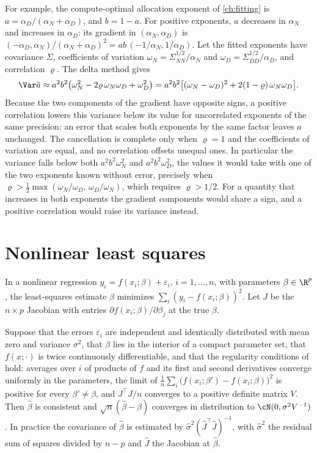 \begin{refsection}
For example, the compute-optimal allocation exponent of \cref{ch:fitting} is $a=\alpha_D/(\alpha_N+\alpha_D)$, and $b=1-a$. For positive exponents, $a$ decreases in $\alpha_N$ and increases in $\alpha_D$: its gradient in $(\alpha_N,\alpha_D)$ is $(-\alpha_D,\alpha_N)/(\alpha_N+\alpha_D)^2=ab\,(-1/\alpha_N,1/\alpha_D)$. Let the fitted exponents have covariance $\Sigma$, coefficients of variation $\omega_N=\Sigma_{NN}^{1/2}/\alpha_N$ and $\omega_D=\Sigma_{DD}^{1/2}/\alpha_D$, and correlation $\varrho$. The delta method gives
\[
\Var\hat a\approx a^2b^2\bigl(\omega_N^2-2\varrho\,\omega_N\omega_D+\omega_D^2\bigr)=a^2b^2\bigl[(\omega_N-\omega_D)^2+2(1-\varrho)\,\omega_N\omega_D\bigr].
\]
Because the two components of the gradient have opposite signs, a positive correlation lowers this variance below its value for uncorrelated exponents of the same precision: an error that scales both exponents by the same factor leaves $a$ unchanged. The cancellation is complete only when $\varrho=1$ and the coefficients of variation are equal, and no correlation offsets unequal ones. In particular the variance falls below both $a^2b^2\omega_N^2$ and $a^2b^2\omega_D^2$, the values it would take with one of the two exponents known without error, precisely when $\varrho>\frac12\max(\omega_N/\omega_D,\,\omega_D/\omega_N)$, which requires $\varrho>1/2$. For a quantity that increases in both exponents the gradient components would share a sign, and a positive correlation would raise its variance instead.

\section{Nonlinear least squares}\label{sec:toolkit:nls}

In a nonlinear regression $y_i=f(x_i;\beta)+\varepsilon_i$, $i=1,\dots,n$, with parameters $\beta\in\R^p$, the least-squares estimate $\hat\beta$ minimizes $\sum_i(y_i-f(x_i;\beta))^2$. Let $J$ be the $n\times p$ Jacobian with entries $\partial f(x_i;\beta)/\partial\beta_j$ at the true $\beta$.

\begin{theorem}\label{thm:toolkit:nls}
Suppose that the errors $\varepsilon_i$ are independent and identically distributed with mean zero and variance $\sigma^2$, that $\beta$ lies in the interior of a compact parameter set, that $f(x;\cdot)$ is twice continuously differentiable, and that the regularity conditions of \textcite{Jennrich1969} hold: averages over $i$ of products of $f$ and its first and second derivatives converge uniformly in the parameters, the limit of $\frac1n\sum_i\bigl(f(x_i;\beta')-f(x_i;\beta)\bigr)^2$ is positive for every $\beta'\ne\beta$, and $J^\top J/n$ converges to a positive definite matrix $V$. Then $\hat\beta$ is consistent and $\sqrt n(\hat\beta-\beta)$ converges in distribution to $\cN(0,\sigma^2V^{-1})$. In practice the covariance of $\hat\beta$ is estimated by $\hat\sigma^2(\hat J^\top\hat J)^{-1}$, with $\hat\sigma^2$ the residual sum of squares divided by $n-p$ and $\hat J$ the Jacobian at $\hat\beta$.
\end{theorem}


\end{refsection}
